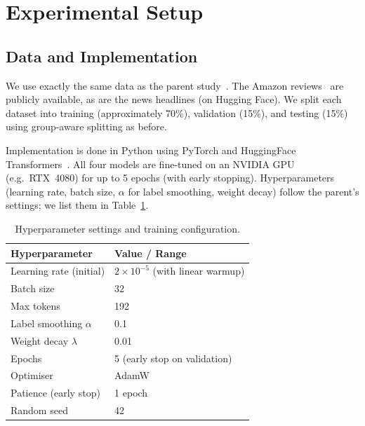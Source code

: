 
\section{Experimental Setup}\label{sec:experimental_setup}

\subsection{Data and Implementation}\label{subsec:data_implementation}

We use exactly the same data as the parent study~\cite{oprea2025llm}. The Amazon reviews~\cite{filatova2012irony} are publicly available, as are the news headlines (on Hugging Face). We split each dataset into training (approximately 70\%), validation (15\%), and testing (15\%) using group-aware splitting as before.

Implementation is done in Python using PyTorch and HuggingFace Transformers~\cite{wolf2020transformers}. All four models are fine-tuned on an NVIDIA GPU (e.g.\ RTX~4080) for up to 5 epochs (with early stopping). Hyperparameters (learning rate, batch size, $\alpha$ for label smoothing, weight decay) follow the parent's settings; we list them in Table~\ref{tab:hyperparameters}.

\begin{table}[htbp]
\caption{Hyperparameter settings and training configuration.}
\label{tab:hyperparameters}
\begin{tabular}{ll}
\toprule
\textbf{Hyperparameter}       & \textbf{Value / Range} \\
\midrule
Learning rate (initial)        & $2 \times 10^{-5}$ (with linear warmup) \\
Batch size                     & 32 \\
Max tokens                     & 192 \\
Label smoothing $\alpha$       & 0.1 \\
Weight decay $\lambda$         & 0.01 \\
Epochs                         & 5 (early stop on validation) \\
Optimiser                      & AdamW \\
Patience (early stop)          & 1 epoch \\
Random seed                    & 42 \\
\bottomrule
\end{tabular}
\end{table}


